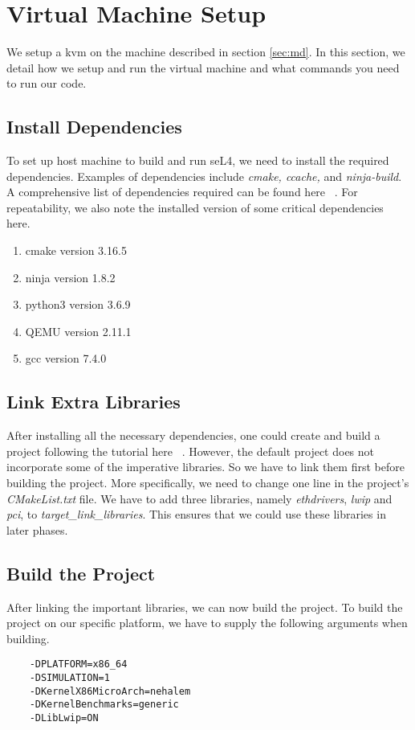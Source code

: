 \section{Virtual Machine Setup}
We setup a kvm on the machine described in section \ref{sec:md}.
In this section, 
we detail how we setup and run the virtual machine and 
what commands you need to run our code.

\subsection{Install Dependencies}
To set up host machine to build and run seL4, 
we need to install the required dependencies.
Examples of dependencies include \textit{cmake, ccache,} and \textit{ninja-build}.
A comprehensive list of dependencies required can be found here ~\cite{HostDepe94:online}. 
For repeatability, we also note the installed version of some critical dependencies here.
\begin{enumerate}
    \item cmake version 3.16.5
    \item ninja version 1.8.2
    \item python3 version 3.6.9
    \item QEMU version 2.11.1
    \item gcc version 7.4.0    
\end{enumerate}

\subsection{Link Extra Libraries}
After installing all the necessary dependencies, 
one could create and build a project following the tutorial here ~\cite{Tutorial63:online}. 
However, 
the default project does not incorporate some of the imperative
libraries. So we have to link them first before building the project. More specifically, we need to change one line in the project's \textit{CMakeList.txt} file.
We have to add three libraries, namely \textit{ethdrivers}, \textit{lwip} and \textit{pci}, 
to \textit{target\_link\_libraries}. 
This ensures that we could use these libraries in later phases.

\subsection{Build the Project}
After linking the important libraries, 
we can now build the project.
To build the project on our specific platform, 
we have to supply the following arguments when building.
\begin{lstlisting}
    -DPLATFORM=x86_64
    -DSIMULATION=1
    -DKernelX86MicroArch=nehalem
    -DKernelBenchmarks=generic
    -DLibLwip=ON    
\end{lstlisting}

